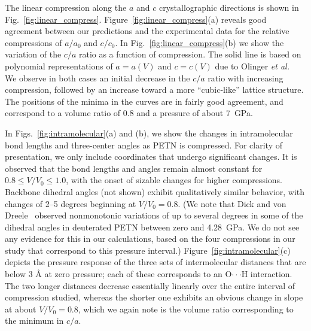 \documentclass[prb,aps,nobibnotes,superbib,preprint]{revtex4}
\begin{document}
The linear compression along the $a$ and $c$ crystallographic
directions is shown in Fig.~\ref{fig:linear_compress}.
Figure~\ref{fig:linear_compress}(a) reveals good agreement between our
predictions and the experimental data for the relative compressions of
$a/a_0$ and $c/c_0$.
In Fig.~\ref{fig:linear_compress}(b) we show the variation of the
$c/a$ ratio as a function of compression.
The solid line is based on polynomial representations of $a=a(V)$ and
$c=c(V)$ due to Olinger {\it et al.}~\cite{Olinger_1975v62} We observe
in both cases an initial decrease in the $c/a$ ratio with increasing
compression, followed by an increase toward a more ``cubic-like''
lattice structure.  The positions of the minima in the curves are in
fairly good agreement, and correspond to a volume ratio of 0.8 and a
pressure of about 7~GPa.

In Figs.~\ref{fig:intramolecular}(a) and (b), we show the changes in
intramolecular bond lengths and three-center angles as PETN is
compressed.  For clarity of presentation, we only include coordinates that
undergo significant changes.  It is observed that the bond lengths and angles
remain almost constant for $ 0.8 \leq V/V_0 \leq 1.0$, with the onset of
sizable changes for higher compressions.  Backbone dihedral angles (not shown)
exhibit qualitatively similar behavior, with changes of 2--5 degrees beginning
at $V/V_0=0.8$. (We note that Dick and von Dreele~\cite{Dick_1997} observed
nonmonotonic variations of up to several degrees in some of the dihedral
angles in deuterated PETN between zero and 4.28~GPa.  We do not see any
evidence for this in our calculations, based on the four compressions in
our study that correspond to this pressure interval.)
Figure~\ref{fig:intramolecular}(c) depicts the pressure response of 
the three sets of intermolecular distances that are below 3 \AA\/ at zero
pressure; each of these corresponds to an O$\cdot\cdot\cdot$H
interaction.  The two longer distances decrease essentially linearly
over the entire interval of compression studied, whereas the shorter
one exhibits an obvious change in slope at about $V/V_0=0.8$, which we
again note is the volume ratio corresponding to the minimum in $c/a$.
\end{document}
